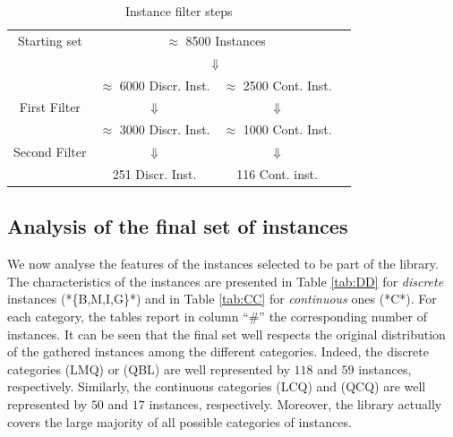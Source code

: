 \begin{table}
 \centering
 \setlength{\tabcolsep}{5pt}
\begin{tabular}{cccc}
Starting set& \multicolumn{ 2}{c}{ $\approx$ 8500 Instances }& \\
& \multicolumn{ 2}{c}{$\Downarrow$}& \\
& $\approx$ 6000 Discr. Inst.  & $\approx$ 2500 Cont. Inst. & \\
First Filter  & $\Downarrow$  & $\Downarrow$ & \\
 & $\approx$ 3000 Discr. Inst.  & $\approx$ 1000 Cont. Inst. & \\
Second Filter & $\Downarrow$  & $\Downarrow$  & \\
  & 251 Discr. Inst.  & 116  Cont. inst. & \\
\end{tabular}
\caption{Instance filter steps} \label{tab:filters}
\end{table}

\subsection{Analysis of the final set of instances}\label{subsec:final set}

We now analyse the features of the instances selected to be part of the
library. The characteristics of the instances are presented in Table
\ref{tab:DD} for \emph{discrete} instances (*\{B,M,I,G\}*) and in Table
\ref{tab:CC} for \emph{continuous} ones (*C*). For each category, the tables
report in column ``$\#$'' the corresponding number of instances. It can be seen
that the final set well respects the original distribution of the gathered
instances among the different categories. Indeed, the discrete categories
(LMQ) or (QBL) are well represented by $118$ and $59$ instances,
respectively. Similarly, the continuous categories (LCQ) and (QCQ) are well
represented by $50$ and $17$ instances, respectively. Moreover, the library
actually covers the large majority of all possible categories of instances.

